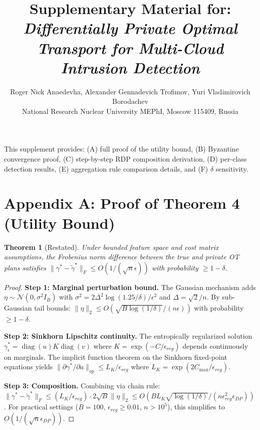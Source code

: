 \documentclass[11pt]{article}
\title{Supplementary Material for:\\[4pt]
\textit{Differentially Private Optimal Transport for Multi-Cloud Intrusion Detection}}
\author{Roger Nick Anaedevha, Alexander Gennadevich Trofimov, Yuri Vladimirovich Borodachev\\
\small National Research Nuclear University MEPhI, Moscow 115409, Russia}
\date{}
\theoremstyle{plain}
\newtheorem{theorem}{Theorem}
\theoremstyle{definition}
\theoremstyle{remark}
\DeclareMathOperator{\diag}{diag}
\begin{document}
\maketitle

\noindent This supplement provides: (A) full proof of the utility bound, (B) Byzantine convergence proof, (C) step-by-step RDP composition derivation, (D) per-class detection results, (E) aggregation rule comparison details, and (F) $\delta$ sensitivity.

\section*{Appendix A: Proof of Theorem 4 (Utility Bound)}
\setcounter{theorem}{3}
\begin{theorem}[Restated] Under bounded feature space and cost matrix assumptions, the Frobenius norm difference between the true and private OT plans satisfies $\|\gamma^* - \tilde{\gamma}^*\|_F \leq O(1/(\sqrt{n}\epsilon))$ with probability $\geq 1 - \delta$.
\end{theorem}
\begin{proof}
\textbf{Step 1: Marginal perturbation bound.} The Gaussian mechanism adds $\eta \sim \mathcal{N}(0, \sigma^2 I_B)$ with $\sigma^2 = 2\Delta^2\log(1.25/\delta)/\epsilon^2$ and $\Delta = \sqrt{2}/n$. By sub-Gaussian tail bounds: $\|\eta\|_2 \leq O(\sqrt{B\log(1/\delta)}/(n\epsilon))$ with probability $\geq 1-\delta$.

\textbf{Step 2: Sinkhorn Lipschitz continuity.} The entropically regularized solution $\gamma_\epsilon^* = \diag(u)K\diag(v)$ where $K = \exp(-C/\epsilon_{reg})$ depends continuously on marginals. The implicit function theorem on the Sinkhorn fixed-point equations yields $\|\partial\gamma^*/\partial a\|_{op} \leq L_K/\epsilon_{reg}$ where $L_K = \exp(2C_{\max}/\epsilon_{reg})$.

\textbf{Step 3: Composition.} Combining via chain rule: $\|\gamma^* - \tilde{\gamma}^*\|_F \leq (L_K/\epsilon_{reg}) \cdot 2\sqrt{B}\|\eta\|_2 \leq O(BL_K\sqrt{\log(1/\delta)}/(n\epsilon^2_{reg}\epsilon_{DP}))$. For practical settings ($B=100$, $\epsilon_{reg} \geq 0.01$, $n > 10^5$), this simplifies to $O(1/(\sqrt{n}\epsilon_{DP}))$.
\end{proof}
\end{document}
